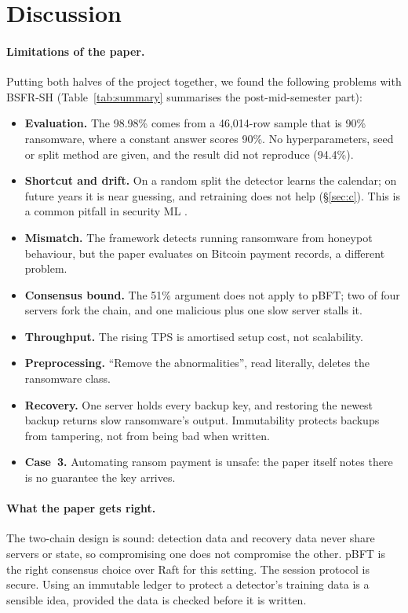\documentclass[11pt]{article}
\begin{document}
\section{Discussion}
\label{sec:discussion}

\paragraph{Limitations of the paper.} Putting both halves of the project together, we found the
following problems with BSFR-SH (Table~\ref{tab:summary} summarises the post-mid-semester part):
\begin{itemize}
\setlength\itemsep{0pt}
\item \textbf{Evaluation.} The 98.98\% comes from a 46,014-row sample that is 90\% ransomware,
where a constant answer scores 90\%. No hyperparameters, seed or split method are given, and the
result did not reproduce (94.4\%).
\item \textbf{Shortcut and drift.} On a random split the detector learns the calendar; on future
years it is near guessing, and retraining does not help (\S\ref{sec:c}). This is a common pitfall
in security ML \citep{arp2022dos}.
\item \textbf{Mismatch.} The framework detects running ransomware from honeypot behaviour, but the
paper evaluates on Bitcoin payment records, a different problem.
\item \textbf{Consensus bound.} The 51\% argument does not apply to pBFT; two of four servers fork
the chain, and one malicious plus one slow server stalls it.
\item \textbf{Throughput.} The rising TPS is amortised setup cost, not scalability.
\item \textbf{Preprocessing.} ``Remove the abnormalities'', read literally, deletes the ransomware
class.
\item \textbf{Recovery.} One server holds every backup key, and restoring the newest backup returns
slow ransomware's output. Immutability protects backups from tampering, not from being bad when
written.
\item \textbf{Case~3.} Automating ransom payment is unsafe: the paper itself notes there is no
guarantee the key arrives.
\end{itemize}

\paragraph{What the paper gets right.} The two-chain design is sound: detection data and recovery
data never share servers or state, so compromising one does not compromise the other. pBFT is the
right consensus choice over Raft for this setting. The session protocol is secure. Using an
immutable ledger to protect a detector's training data is a sensible idea, provided the data is
checked before it is written.
\end{document}
